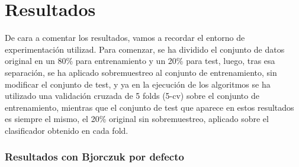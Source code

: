 \section{Resultados} \label{resultados}

De cara a comentar los resultados, vamos a recordar el entorno de experimentación utilizad. Para comenzar, se ha dividido el conjunto de datos original en un 80\% para entrenamiento y un 20\% para test, luego, tras esa separación, se ha aplicado sobremuestreo al conjunto de entrenamiento, sin modificar el conjunto de test, y ya en la ejecución de los algoritmos se ha utilizado una validación cruzada de 5 folds (5-cv) sobre el conjunto de entrenamiento, mientras que el conjunto de test que aparece en estos resultados es siempre el mismo, el 20\% original sin sobremuestreo, aplicado sobre el clasificador obtenido en cada fold.

\subsubsection{Resultados con Bjorczuk por defecto}


